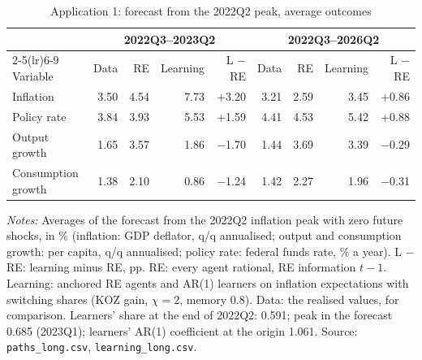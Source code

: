 \begin{table}[tbp]
\centering
\small
\caption{Application 1: forecast from the 2022Q2 peak, average outcomes}
\label{tab:app1}
\begin{tabular}{lrrrrrrrr}
\toprule
& \multicolumn{4}{c}{2022Q3--2023Q2} & \multicolumn{4}{c}{2022Q3--2026Q2} \\
\cmidrule(lr){2-5}\cmidrule(lr){6-9}
Variable & Data & RE & Learning & L $-$ RE & Data & RE & Learning & L $-$ RE \\
\midrule
Inflation & 3.50 & 4.54 & 7.73 & +3.20 & 3.21 & 2.59 & 3.45 & +0.86 \\
Policy rate & 3.84 & 3.93 & 5.53 & +1.59 & 4.41 & 4.53 & 5.42 & +0.88 \\
Output growth & 1.65 & 3.57 & 1.86 & $-$1.70 & 1.44 & 3.69 & 3.39 & $-$0.29 \\
Consumption growth & 1.38 & 2.10 & 0.86 & $-$1.24 & 1.42 & 2.27 & 1.96 & $-$0.31 \\
\bottomrule
\end{tabular}
\par\smallskip
\begin{minipage}{\linewidth}\footnotesize
\textit{Notes:} Averages of the forecast from the 2022Q2 inflation peak with zero future shocks, in \% (inflation: GDP deflator, q/q annualised; output and consumption growth: per capita, q/q annualised; policy rate: federal funds rate, \% a year). L $-$ RE: learning minus RE, pp. RE: every agent rational, RE information $t-1$. Learning: anchored RE agents and AR(1) learners on inflation expectations with switching shares (KOZ gain, $\chi=2$, memory 0.8). Data: the realised values, for comparison. Learners' share at the end of 2022Q2: 0.591; peak in the forecast 0.685 (2023Q1); learners' AR(1) coefficient at the origin 1.061. Source: \texttt{paths\_long.csv}, \texttt{learning\_long.csv}.
\end{minipage}
\end{table}
